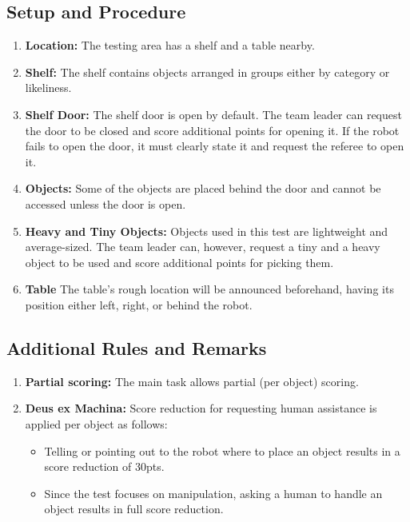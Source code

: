 \subsection*{Setup and Procedure}
\begin{enumerate}
	\item \textbf{Location:} The testing area has a shelf and a table nearby.

	\item \textbf{Shelf:} The shelf contains objects arranged in groups either by category or likeliness.

	\item \textbf{Shelf Door:} The shelf door is open by default.
	The team leader can request the door to be closed and score additional points for opening it. If the robot fails to open the door, it must clearly state it and request the referee to open it.

	\item \textbf{Objects:} Some of the objects are placed behind the door and cannot be accessed unless the door is open.
	
	\item \textbf{Heavy and Tiny Objects:} Objects used in this test are lightweight and average-sized.
	The team leader can, however, request a tiny and a heavy object to be used and score additional points for picking them.

	\item \textbf{Table} The table's rough location will be announced beforehand, having its position either left, right, or behind the robot.
\end{enumerate}


%
%
\subsection*{Additional Rules and Remarks}
\begin{enumerate}
	\item \textbf{Partial scoring:} The main task allows partial (per object) scoring.
	\item \textbf{Deus ex Machina:} Score reduction for requesting human assistance is applied per object as follows:
	\begin{itemize}[nosep]
		\item Telling or pointing out to the robot where to place an object results in a score reduction of 30pts.
		\item Since the test focuses on manipulation, asking a human to handle an object results in full score reduction.
	\end{itemize}
\end{enumerate}

